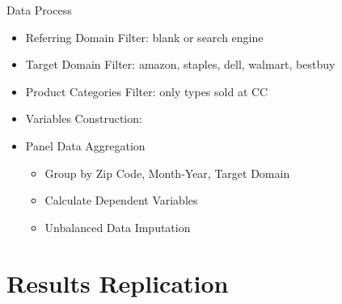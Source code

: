 \documentclass[mathserif, xcolor=table]{beamer}
\begin{document}
\begin{frame}{Data Process}
	\begin{itemize}
		\item Referring Domain Filter: blank or search engine
		\item Target Domain Filter: amazon, staples, dell, walmart, bestbuy
		\item Product Categories Filter: only types sold at CC
		\item Variables Construction:
		\begin{itemize}
		\end{itemize}
		\item Panel Data Aggregation
		\begin{itemize}
			\item Group by Zip Code, Month-Year, Target Domain
			\item Calculate Dependent Variables
			\item Unbalanced Data Imputation
		\end{itemize}
	\end{itemize}
\end{frame}

\section{Results Replication}
\end{document}
